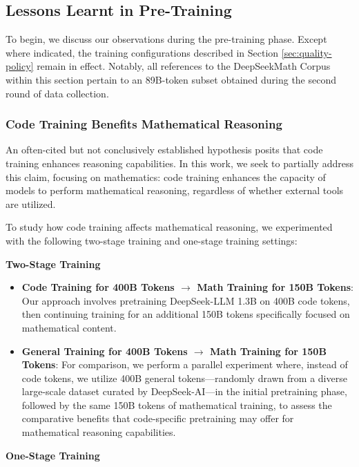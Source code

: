 \begin{itemize}[topsep=0pt]
\begin{itemize}[topsep=0pt]
\subsection{Lessons Learnt in Pre-Training}

To begin, we discuss our observations during the pre-training phase. Except where indicated, the training configurations described in Section \ref{sec:quality-policy} remain in effect. Notably, all references to the DeepSeekMath Corpus within this section pertain to an 89B-token subset obtained during the second round of data collection.

\subsubsection{Code Training Benefits Mathematical Reasoning}

An often-cited but not conclusively established hypothesis posits that code training enhances reasoning capabilities. In this work, we seek to partially address this claim, focusing on mathematics: code training enhances the capacity of models to perform mathematical reasoning, regardless of whether external tools are utilized.

To study how code training affects mathematical reasoning, we experimented with the following two-stage training and one-stage training settings:

\textbf{Two-Stage Training}

\begin{itemize}[topsep=0pt]
    \item \textbf{Code Training for 400B Tokens $\rightarrow$ Math Training for 150B Tokens}: Our approach involves pretraining DeepSeek-LLM 1.3B on 400B code tokens, then continuing training for an additional 150B tokens specifically focused on mathematical content.
    \item \textbf{General Training for 400B Tokens $\rightarrow$ Math Training for 150B Tokens}: For comparison, we perform a parallel experiment where, instead of code tokens, we utilize 400B general tokens—randomly drawn from a diverse large-scale dataset curated by DeepSeek-AI—in the initial pretraining phase, followed by the same 150B tokens of mathematical training, to assess the comparative benefits that code-specific pretraining may offer for mathematical reasoning capabilities.
\end{itemize}

\textbf{One-Stage Training}


\end{itemize}
\end{itemize}
